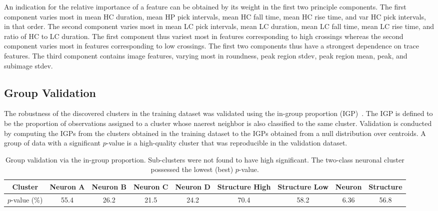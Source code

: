 \documentclass[10pt]{article}
\begin{document}
An indication for the relative importance of a feature can be obtained by its weight in the first two principle components.
The first component varies most in mean HC duration, mean HP pick intervals, mean HC fall time, mean HC rise time, and var HC pick intervals, in that order.
The second component varies most in mean LC pick intervals, mean LC duration, mean LC fall time, mean LC rise time, and ratio of HC to LC duration. 
The first component thus variest most in features corresponding to high crossings whereas the second component varies most in features corresponding to low crossings.
The first two components thus have a strongest dependence on trace features.
The third component contains image features, varying most in roundness, peak region stdev, peak region mean, peak, and subimage stdev.

\subsection{Group Validation}

The robustness of the discovered clusters in the training dataset was validated using the in-group proportion (IGP)~\cite{Kapp01012007}.
The IGP is defined to be the proportion of observations assigned to a cluster whose naerest neighbor is also classified to the same cluster.
Validation is conducted by computing the IGPs from the clusters obtained in the training dataset to the IGPs obtained from a null distribution over centroids. A group of data with a significant $p$-value is a high-quality cluster that was reproducible in the validation dataset.

\begin{table}[h]
    \centering

    \scriptsize

    \begin{tabular}{ccccccccc}
    \toprule
    Cluster & Neuron A & Neuron B & Neuron C & Neuron D & Structure High & Structure Low & Neuron & Structure \\
    \midrule
    $p$-value (\%) & \num{55.4} & \num{26.2} & \num{21.5} & \num{24.2} & \num{70.4} & \num{58.2} & \num{6.36} & \num{56.8} \\
    \bottomrule
    \end{tabular}
    
    \caption{\footnotesize Group validation via the in-group proportion. Sub-clusters were not found to have high significant. The two-class neuronal cluster possessed the lowest (best) $p$-value.}
    \label{table:groupvalidation}
\end{table}
\end{document}
